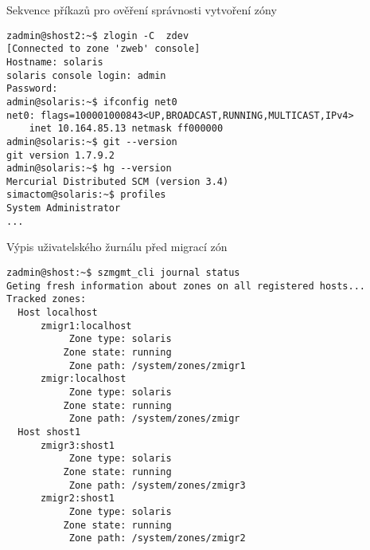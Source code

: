 \begin{listing}[ht]
  \caption{Sekvence příkazů pro ověření správnosti vytvoření zóny}
  \label{code:test:deployment:result}
  \begin{verbatim} 
zadmin@shost2:~$ zlogin -C  zdev
[Connected to zone 'zweb' console]
Hostname: solaris
solaris console login: admin
Password:
admin@solaris:~$ ifconfig net0
net0: flags=100001000843<UP,BROADCAST,RUNNING,MULTICAST,IPv4>
    inet 10.164.85.13 netmask ff000000
admin@solaris:~$ git --version
git version 1.7.9.2
admin@solaris:~$ hg --version
Mercurial Distributed SCM (version 3.4)
simactom@solaris:~$ profiles
System Administrator
...
  \end{verbatim}
\end{listing}

\begin{listing}[ht]
  \caption{Výpis uživatelského žurnálu před migrací zón}
  \label{code:test:migration:before}
  \begin{verbatim}
zadmin@shost:~$ szmgmt_cli journal status
Geting fresh information about zones on all registered hosts...
Tracked zones:
  Host localhost
      zmigr1:localhost
           Zone type: solaris
          Zone state: running
           Zone path: /system/zones/zmigr1
      zmigr:localhost
           Zone type: solaris
          Zone state: running
           Zone path: /system/zones/zmigr                 
  Host shost1
      zmigr3:shost1
           Zone type: solaris
          Zone state: running
           Zone path: /system/zones/zmigr3
      zmigr2:shost1
           Zone type: solaris
          Zone state: running
           Zone path: /system/zones/zmigr2      
  \end{verbatim}
\end{listing}


